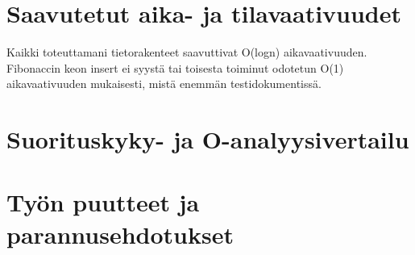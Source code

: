 \documentclass[11pt,a4paper]{article}
\begin{document}
\section{Saavutetut aika- ja tilavaativuudet}
Kaikki toteuttamani tietorakenteet saavuttivat O(logn) aikavaativuuden. Fibonaccin keon insert ei syystä tai toisesta toiminut odotetun O(1) aikavaativuuden mukaisesti, mistä enemmän testidokumentissä.
\section{Suorituskyky- ja O-analyysivertailu}

\section{Työn puutteet ja parannusehdotukset}
\end{document}
